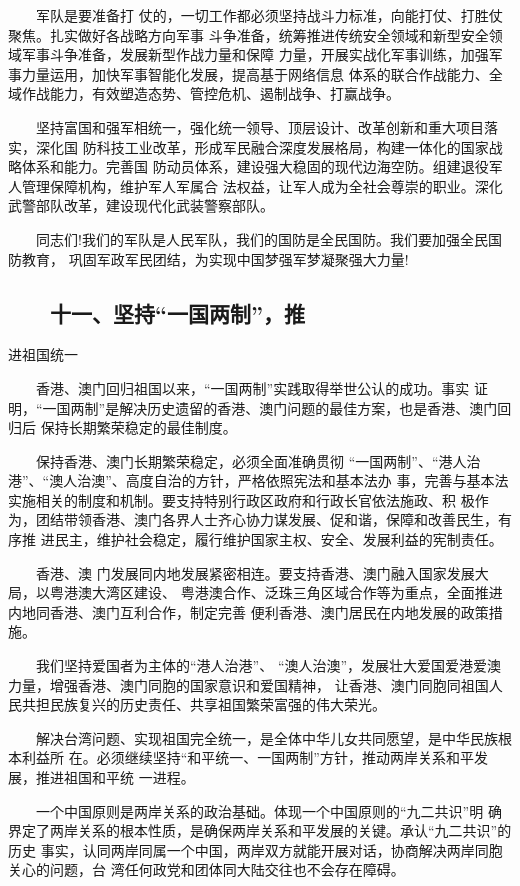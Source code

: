 \documentclass[11pt]{ctexart}
\begin{document}
{{{{　　军队是要准备打
仗的，一切工作都必须坚持战斗力标准，向能打仗、打胜仗聚焦。扎实做好各战略方向军事
斗争准备，统筹推进传统安全领域和新型安全领域军事斗争准备，发展新型作战力量和保障
力量，开展实战化军事训练，加强军事力量运用，加快军事智能化发展，提高基于网络信息
体系的联合作战能力、全域作战能力，有效塑造态势、管控危机、遏制战争、打赢战争。

　　坚持富国和强军相统一，强化统一领导、顶层设计、改革创新和重大项目落实，深化国
防科技工业改革，形成军民融合深度发展格局，构建一体化的国家战略体系和能力。完善国
防动员体系，建设强大稳固的现代边海空防。组建退役军人管理保障机构，维护军人军属合
法权益，让军人成为全社会尊崇的职业。深化武警部队改革，建设现代化武装警察部队。

　　同志们!我们的军队是人民军队，我们的国防是全民国防。我们要加强全民国防教育，
巩固军政军民团结，为实现中国梦强军梦凝聚强大力量!

\subsection{　　十一、坚持“一国两制”，推}
\label{sec:org8feeb4e}
进祖国统一

　　香港、澳门回归祖国以来，“一国两制”实践取得举世公认的成功。事实
证明，“一国两制”是解决历史遗留的香港、澳门问题的最佳方案，也是香港、澳门回归后
保持长期繁荣稳定的最佳制度。

　　保持香港、澳门长期繁荣稳定，必须全面准确贯彻
“一国两制”、“港人治港”、“澳人治澳”、高度自治的方针，严格依照宪法和基本法办
事，完善与基本法实施相关的制度和机制。要支持特别行政区政府和行政长官依法施政、积
极作为，团结带领香港、澳门各界人士齐心协力谋发展、促和谐，保障和改善民生，有序推
进民主，维护社会稳定，履行维护国家主权、安全、发展利益的宪制责任。

　　香港、澳
门发展同内地发展紧密相连。要支持香港、澳门融入国家发展大局，以粤港澳大湾区建设、
粤港澳合作、泛珠三角区域合作等为重点，全面推进内地同香港、澳门互利合作，制定完善
便利香港、澳门居民在内地发展的政策措施。

　　我们坚持爱国者为主体的“港人治港”、
“澳人治澳”，发展壮大爱国爱港爱澳力量，增强香港、澳门同胞的国家意识和爱国精神，
让香港、澳门同胞同祖国人民共担民族复兴的历史责任、共享祖国繁荣富强的伟大荣光。

　　解决台湾问题、实现祖国完全统一，是全体中华儿女共同愿望，是中华民族根本利益所
在。必须继续坚持“和平统一、一国两制”方针，推动两岸关系和平发展，推进祖国和平统
一进程。

　　一个中国原则是两岸关系的政治基础。体现一个中国原则的“九二共识”明
确界定了两岸关系的根本性质，是确保两岸关系和平发展的关键。承认“九二共识”的历史
事实，认同两岸同属一个中国，两岸双方就能开展对话，协商解决两岸同胞关心的问题，台
湾任何政党和团体同大陆交往也不会存在障碍。

}}}}
\end{document}
